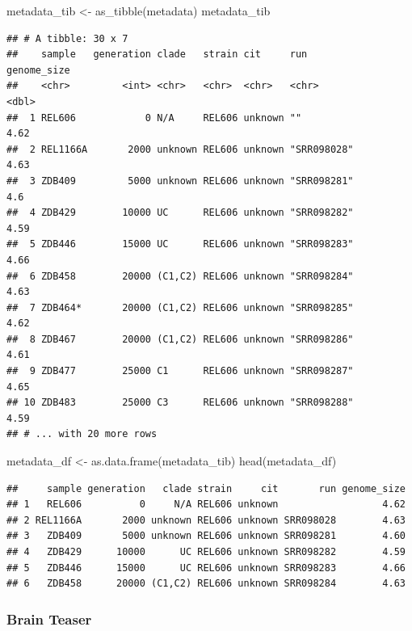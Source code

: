 \documentclass[
]{book}
\newenvironment{Shaded}{\begin{snugshade}}{\end{snugshade}}
\newcommand{\FunctionTok}[1]{\textcolor[rgb]{0.00,0.00,0.00}{#1}}
\newcommand{\NormalTok}[1]{#1}
\newcommand{\OtherTok}[1]{\textcolor[rgb]{0.56,0.35,0.01}{#1}}
\begin{document}
\begin{Shaded}
\begin{Highlighting}[]
\NormalTok{metadata\_tib }\OtherTok{\textless{}{-}} \FunctionTok{as\_tibble}\NormalTok{(metadata)}
\NormalTok{metadata\_tib}
\end{Highlighting}
\end{Shaded}

\begin{verbatim}
## # A tibble: 30 x 7
##    sample   generation clade   strain cit     run         genome_size
##    <chr>         <int> <chr>   <chr>  <chr>   <chr>             <dbl>
##  1 REL606            0 N/A     REL606 unknown ""                 4.62
##  2 REL1166A       2000 unknown REL606 unknown "SRR098028"        4.63
##  3 ZDB409         5000 unknown REL606 unknown "SRR098281"        4.6 
##  4 ZDB429        10000 UC      REL606 unknown "SRR098282"        4.59
##  5 ZDB446        15000 UC      REL606 unknown "SRR098283"        4.66
##  6 ZDB458        20000 (C1,C2) REL606 unknown "SRR098284"        4.63
##  7 ZDB464*       20000 (C1,C2) REL606 unknown "SRR098285"        4.62
##  8 ZDB467        20000 (C1,C2) REL606 unknown "SRR098286"        4.61
##  9 ZDB477        25000 C1      REL606 unknown "SRR098287"        4.65
## 10 ZDB483        25000 C3      REL606 unknown "SRR098288"        4.59
## # ... with 20 more rows
\end{verbatim}

\begin{Shaded}
\begin{Highlighting}[]
\NormalTok{metadata\_df }\OtherTok{\textless{}{-}} \FunctionTok{as.data.frame}\NormalTok{(metadata\_tib)}
\FunctionTok{head}\NormalTok{(metadata\_df)}
\end{Highlighting}
\end{Shaded}

\begin{verbatim}
##     sample generation   clade strain     cit       run genome_size
## 1   REL606          0     N/A REL606 unknown                  4.62
## 2 REL1166A       2000 unknown REL606 unknown SRR098028        4.63
## 3   ZDB409       5000 unknown REL606 unknown SRR098281        4.60
## 4   ZDB429      10000      UC REL606 unknown SRR098282        4.59
## 5   ZDB446      15000      UC REL606 unknown SRR098283        4.66
## 6   ZDB458      20000 (C1,C2) REL606 unknown SRR098284        4.63
\end{verbatim}

\hypertarget{brain-teaser}{%
\subsubsection*{Brain Teaser}\label{brain-teaser}}
\end{document}

